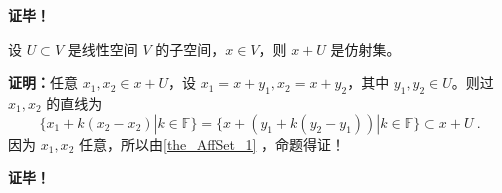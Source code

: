 \textbf{证毕！}


\begin{corollary}{}\label{cor_AffSet_1}
设 $U\subset V$ 是线性空间 $V$ 的子空间，$x\in V$，则 $x+U$ 是仿射集。 
\end{corollary}

\textbf{证明：}任意 $x_1,x_2\in x+U$，设 $x_1=x+y_1,x_2=x+y_2$，其中 $y_1,y_2\in U$。则过 $x_1,x_2$ 的直线为
\begin{equation}
\{x_1+k(x_2-x_2)|k\in\mathbb F\}=\{x+(y_1+k(y_2-y_1))|k\in\mathbb F\}\subset x+U~.
\end{equation}
因为 $x_1,x_2$ 任意，所以由\autoref{the_AffSet_1} ，命题得证！

\textbf{证毕！}




